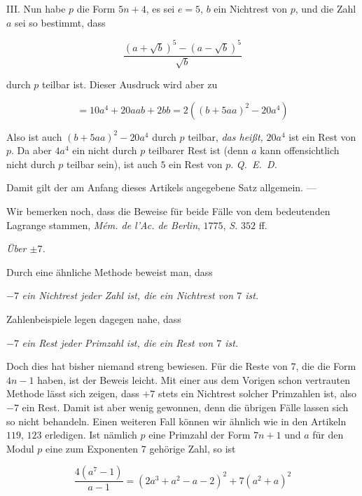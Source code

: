 III. Nun habe $p$ die Form $5n+4$, es sei $e=5$, $b$ ein Nichtrest von $p$, und die Zahl $a$ sei so bestimmt, dass

\[
\frac{(a+\surd b)^5-(a-\surd b)^5}{\surd b}
\]

durch $p$ teilbar ist. Dieser Ausdruck wird aber zu

\[
=10a^4+20aab+2bb=2((b+5aa)^2-20a^4)
\]

Also ist auch $(b+5aa)^2-20a^4$ durch $p$ teilbar, \textit{das heißt,} $20a^4$ ist ein Rest von $p$. Da aber $4a^4$ ein nicht durch $p$ teilbarer Rest ist (denn $a$ kann offensichtlich nicht durch $p$ teilbar sein), ist auch $5$ ein Rest von $p$. \mbox{\textit{Q. E. D.}}

Damit gilt der am Anfang dieses Artikels angegebene Satz allgemein. ---

Wir bemerken noch, dass die Beweise für beide Fälle von dem bedeutenden Lagrange stammen, \textit{M\'em. de l'Ac. de Berlin}, $1775$, \textit{S.} $352$ ff.

\begin{center}\textit{Über $\pm7$.}\end{center}

Durch eine ähnliche Methode beweist man, dass

$-7$ \textit{ein Nichtrest jeder Zahl ist, die ein Nichtrest von $7$ ist.}

Zahlenbeispiele legen dagegen nahe, dass

$-7$ \textit{ein Rest jeder Primzahl ist, die ein Rest von $7$ ist.}

Doch dies hat bisher niemand streng bewiesen. Für die Reste von $7$, die die Form $4n-1$ haben, ist der Beweis leicht. Mit einer aus dem Vorigen schon vertrauten Methode lässt sich zeigen, dass $+7$ stets ein Nichtrest solcher Primzahlen ist, also $-7$ ein Rest. Damit ist aber wenig gewonnen, denn die übrigen Fälle lassen sich so nicht behandeln. Einen weiteren Fall können wir ähnlich wie in den Artikeln $119$, $123$ erledigen. Ist nämlich $p$ eine Primzahl der Form $7n+1$ und $a$ für den Modul $p$ eine zum Exponenten $7$ gehörige Zahl, so ist

\[
\frac{4(a^7-1)}{a-1}=(2a^3+a^2-a-2)^2+7(a^2+a)^2
\]

